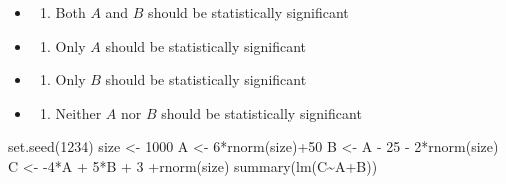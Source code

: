 \documentclass[
]{article}
\newenvironment{Shaded}{\begin{snugshade}}{\end{snugshade}}
\newcommand{\DecValTok}[1]{\textcolor[rgb]{0.00,0.00,0.81}{#1}}
\newcommand{\FunctionTok}[1]{\textcolor[rgb]{0.00,0.00,0.00}{#1}}
\newcommand{\NormalTok}[1]{#1}
\newcommand{\OtherTok}[1]{\textcolor[rgb]{0.56,0.35,0.01}{#1}}
\newcommand{\SpecialCharTok}[1]{\textcolor[rgb]{0.00,0.00,0.00}{#1}}
\providecommand{\tightlist}{%
  \setlength{\itemsep}{0pt}\setlength{\parskip}{0pt}}
\begin{document}
\begin{itemize}
\item
  \begin{enumerate}
  \def\labelenumi{\alph{enumi})}
  \tightlist
  \item
    Both \(A\) and \(B\) should be statistically significant
  \end{enumerate}
\item
  \begin{enumerate}
  \def\labelenumi{\alph{enumi})}
  \setcounter{enumi}{1}
  \tightlist
  \item
    Only \(A\) should be statistically significant
  \end{enumerate}
\item
  \begin{enumerate}
  \def\labelenumi{\alph{enumi})}
  \setcounter{enumi}{2}
  \tightlist
  \item
    Only \(B\) should be statistically significant
  \end{enumerate}
\item
  \begin{enumerate}
  \def\labelenumi{\alph{enumi})}
  \setcounter{enumi}{3}
  \tightlist
  \item
    Neither \(A\) nor \(B\) should be statistically significant
  \end{enumerate}
\end{itemize}

\begin{Shaded}
\begin{Highlighting}[]
\FunctionTok{set.seed}\NormalTok{(}\DecValTok{1234}\NormalTok{)}
\NormalTok{size }\OtherTok{\textless{}{-}} \DecValTok{1000}
\NormalTok{A }\OtherTok{\textless{}{-}} \DecValTok{6}\SpecialCharTok{*}\FunctionTok{rnorm}\NormalTok{(size)}\SpecialCharTok{+}\DecValTok{50}
\NormalTok{B }\OtherTok{\textless{}{-}}\NormalTok{ A }\SpecialCharTok{{-}} \DecValTok{25} \SpecialCharTok{{-}} \DecValTok{2}\SpecialCharTok{*}\FunctionTok{rnorm}\NormalTok{(size)}
\NormalTok{C }\OtherTok{\textless{}{-}} \SpecialCharTok{{-}}\DecValTok{4}\SpecialCharTok{*}\NormalTok{A }\SpecialCharTok{+} \DecValTok{5}\SpecialCharTok{*}\NormalTok{B }\SpecialCharTok{+} \DecValTok{3} \SpecialCharTok{+}\FunctionTok{rnorm}\NormalTok{(size)}
\FunctionTok{summary}\NormalTok{(}\FunctionTok{lm}\NormalTok{(C}\SpecialCharTok{\textasciitilde{}}\NormalTok{A}\SpecialCharTok{+}\NormalTok{B))}
\end{Highlighting}
\end{Shaded}
\end{document}
